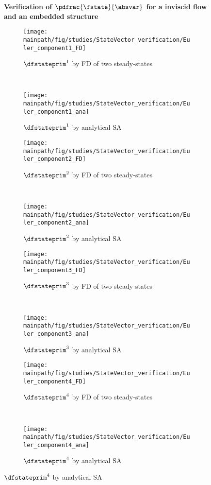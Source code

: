 \documentclass[../main.tex]{subfiles}
\begin{document}
\begin{figure}[t!]
    \centering

    \textbf{Verification of $\pdfrac{\fstate}{\absvar}$ for a inviscid flow and an embedded structure}\par\medskip    
    
    \begin{subfigure}[t]{0.5\textwidth}
        \centering
        \texttt{[image: \\mainpath/fig/studies/StateVector\_verification/Euler\_component1\_FD]}
        \caption{$\dfstateprim^1$ by \ac{FD} of two steady-states}
    \end{subfigure}%
    ~ 
    \begin{subfigure}[t]{0.5\textwidth}
        \centering
        \texttt{[image: \\mainpath/fig/studies/StateVector\_verification/Euler\_component1\_ana]}
        \caption{$\dfstateprim^1$ by analytical \ac{SA}}
    \end{subfigure}
    
    
    \begin{subfigure}[t]{0.5\textwidth}
        \centering
        \texttt{[image: \\mainpath/fig/studies/StateVector\_verification/Euler\_component2\_FD]}
        \caption{$\dfstateprim^2$ by \ac{FD} of two steady-states}
    \end{subfigure}%
    ~ 
    \begin{subfigure}[t]{0.5\textwidth}
        \centering
        \texttt{[image: \\mainpath/fig/studies/StateVector\_verification/Euler\_component2\_ana]}
        \caption{$\dfstateprim^2$ by analytical \ac{SA}}
    \end{subfigure}
    
    
    \begin{subfigure}[t]{0.5\textwidth}
        \centering
        \texttt{[image: \\mainpath/fig/studies/StateVector\_verification/Euler\_component3\_FD]}
        \caption{$\dfstateprim^3$ by \ac{FD} of two steady-states}
    \end{subfigure}%
    ~ 
    \begin{subfigure}[t]{0.5\textwidth}
        \centering
        \texttt{[image: \\mainpath/fig/studies/StateVector\_verification/Euler\_component3\_ana]}
        \caption{$\dfstateprim^3$ by analytical \ac{SA}}
    \end{subfigure}
    
   
    \begin{subfigure}[t]{0.5\textwidth}
        \centering
        \texttt{[image: \\mainpath/fig/studies/StateVector\_verification/Euler\_component4\_FD]}
        \caption{$\dfstateprim^4$ by \ac{FD} of two steady-states}
    \end{subfigure}%
    ~ 
    \begin{subfigure}[t]{0.5\textwidth}
        \centering
        \texttt{[image: \\mainpath/fig/studies/StateVector\_verification/Euler\_component4\_ana]}
        \caption{$\dfstateprim^4$ by analytical \ac{SA}}
    \end{subfigure}
    

\end{figure}
\end{document}
